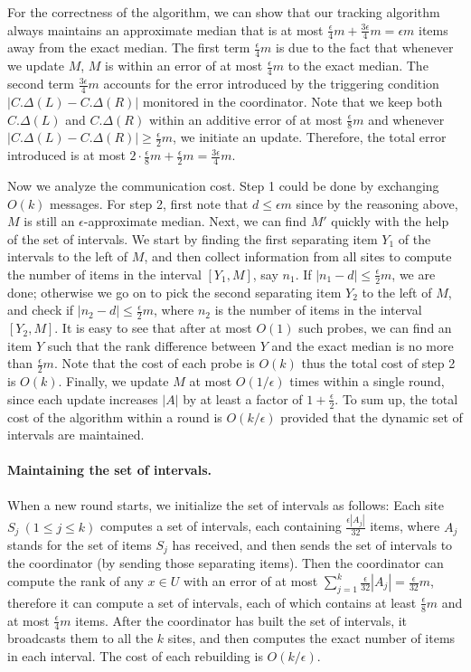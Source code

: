 \documentclass[10pt]{article}
\newcommand{\eps}{\epsilon}
\begin{document}
For the correctness of the algorithm, we can show that our
tracking algorithm always maintains an approximate median that is
at most $\frac{\eps}{4}m + \frac{3\eps}{4}m = \eps m$ items away
from the exact median.  The first term $\frac{\eps}{4}m$ is due to
the fact that whenever we update $M$, $M$ is within an error of
at most $\frac{\eps}{4}m$ to the exact median.  The second term
$\frac{3\eps}{4}m$ accounts for the error introduced by the
triggering condition $|C.\Delta(L) - C.\Delta(R)|$ monitored in
the coordinator. Note that we keep both $C.\Delta(L)$ and
$C.\Delta(R)$ within an additive error of at most $\frac{\eps}{8}
m$ and whenever $|C.\Delta(L) - C.\Delta(R)| \ge \frac{\eps}{2}
m$, we initiate an update.  Therefore, the total error
introduced is at most $2 \cdot \frac{\eps}{8}m + \frac{\eps}{2}
m =  \frac{3\eps}{4}m$.

Now we analyze the communication cost. Step 1 could be done by
exchanging $O(k)$ messages. For step 2, first note that $ d \le
\eps m$ since by the reasoning above, $M$ is still an
$\eps$-approximate median.  Next, we can find $M'$ quickly with
the help of the set of intervals. We start by finding the first
separating item $Y_1$ of the intervals to the left of $M$, and
then collect information from all sites to compute the number of
items in the interval $[Y_1, M]$, say $n_1$.  If $|n_1 - d| \le
\frac{\eps}{2} m$, we are done; otherwise we go on to pick the
second separating item $Y_2$ to the left of $M$, and check if
$|n_2 - d|\le \frac{\eps}{2}m$, where $n_2$ is the number of items
in the interval $[Y_2, M]$. It is easy to see that after at most
$O(1)$ such probes, we can find an item $Y$ such that the rank
difference between $Y$ and the exact median is no more than
$\frac{\eps}{2}m$. Note that the cost of each probe is $O(k)$ thus the
total cost of step 2 is $O(k)$. Finally, we update $M$ at most $O(1/\eps)$ times within
a single round, since each update increases $|A|$ by at least a
factor of $1 + \frac{\eps}{2}$. To sum up, the total cost of
the algorithm within a round is $O(k/\eps)$ provided that the
dynamic set of intervals are maintained.

\paragraph{Maintaining the set of intervals.}
When a new round starts, we initialize
the set of intervals as follows: Each site $S_j\ (1 \le j \le k)$
computes a set of intervals, each containing $\frac{\eps |A_j|}{32}$ items,
where $A_j$ stands for the set of items $S_j$ has received, and then sends
the set of intervals to the coordinator (by sending those separating
items).  Then the coordinator can compute the rank of any $x\in U$ with an
error of at most $\sum_{j=1}^k \frac{\eps}{32} |A_j| = \frac{\eps}{32} m$,
therefore it can compute a set of intervals, each of which contains at
least $\frac{\eps}{8}m$ and at most $\frac{\eps}{4} m$ items. After the
coordinator has built the set of intervals, it broadcasts them to all the
$k$ sites, and then computes the exact number of items in each interval.
  The cost of each rebuilding is $O({k}/{\eps})$.
\end{document}
